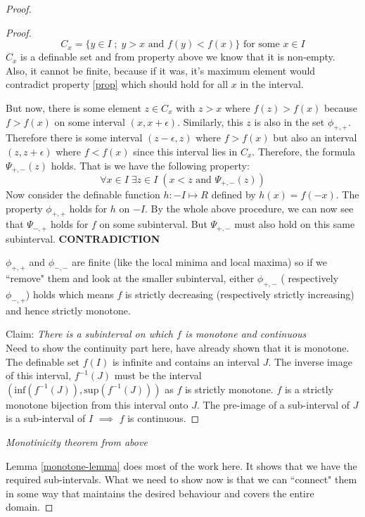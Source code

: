 \begin{definition}
\begin{proof}
\begin{proof}
\begin{equation*}
            C_x = \{y\in I \; ; \; y>x \text{ and } f(y) < f(x)\} \text{ for some } x \in I
        \end{equation*}
        $C_x$ is a definable set and from property above we know that it is non-empty. Also, it cannot be finite, because if it was, it's maximum element would contradict property \ref{prop} which should hold for all $x$ in the interval.
        \par But now, there is some element $z\in C_x$ with $z > x$ where $f(z) > f(x)$ because $f > f(x)$ on some interval $(x, x + \epsilon)$. Similarly, this $z$ is also in the set $\phi_{+, +}$. Therefore there is some interval $(z - \epsilon, z)$ where $f > f(x)$ but also an interval $(z, z + \epsilon)$ where $f < f(x)$ since this interval lies in $C_x$. Therefore, the formula $\Psi_{+,-}(z)$ holds. That is we have the following property:
        \begin{equation}
        \label{prop2}
            \forall x \in I\; \exists z \in I\; (x < z \text{ and } \Psi_{+, -}(z))
        \end{equation}
        Now consider the definable function $h: -I\mapsto R$ defined by $h(x) = f(-x)$. The property $\phi_{+,+}$ holds for $h$ on $-I$. By the whole above procedure, we can now see that $\Psi_{-,+}$ holds for \textbf{$f$} on some subinterval. But $\Psi_{+,-}$ must also hold on this same subinterval. \textbf{CONTRADICTION}
        \par $\phi_{+,+}$ and $\phi_{-,-}$ are finite (like the local minima and local maxima) so if we ``remove" them and look at the smaller subinterval, either $\phi_{+,-}$ ( respectively $\phi_{-,+}$) holds which means $f$ is strictly decreasing (respectively strictly increasing) and hence strictly monotone.
        \par Claim: \textit{There is a subinterval on which $f$ is monotone and continuous} \\Need to show the continuity part here, have already shown that it is monotone. The definable set $f(I)$ is infinite and contains an interval $J$. The inverse image of this interval, $f^{-1}(J)$ must be the interval $(\text{inf}(f^{-1}(J)), \text{sup}(f^{-1}(J)))$ as $f$ is strictly monotone. $f$ is a strictly monotone bijection from this interval onto $J$. The pre-image of a sub-interval of $J$ is a sub-interval of $I$ $\implies$ $f$ is continuous.
    \end{proof}
    \textit{Monotinicity theorem from above}
    \par Lemma \ref{monotone-lemma} does most of the work here. It shows that we have the required sub-intervals. What we need to show now is that we can ``connect" them in some way that maintains the desired behaviour and covers the entire domain.

\end{proof}
\end{definition}
